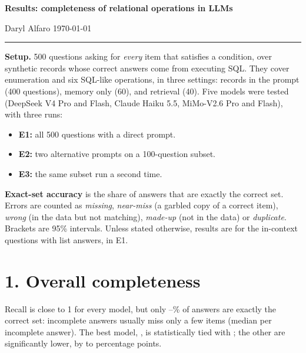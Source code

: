 \documentclass[10pt]{article}
\begin{document}
{\Large\textbf{Results: completeness of relational operations in LLMs}}\par
\vspace{2pt}
Daryl Alfaro \quad\textbullet\quad \today\par
\vspace{-2pt}\rule{\linewidth}{0.4pt}

\textbf{Setup.} 500 questions asking for \emph{every} item that satisfies a condition, over synthetic records
whose correct answers come from executing SQL. They cover enumeration and six SQL-like operations, in three
settings: records in the prompt (400 questions), memory only (60), and retrieval (40). Five models were tested
(DeepSeek V4 Pro and Flash, Claude Haiku 5.5, MiMo-V2.6 Pro and Flash), with three runs:
\begin{itemize}
\item \textbf{E1:} all 500 questions with a direct prompt.
\item \textbf{E2:} two alternative prompts on a 100-question subset.
\item \textbf{E3:} the same subset run a second time.
\end{itemize}
\textbf{Exact-set accuracy} is the share of answers that are exactly the correct set. Errors are counted as
\emph{missing}, \emph{near-miss} (a garbled copy of a correct item), \emph{wrong} (in the data but not matching),
\emph{made-up} (not in the data) or \emph{duplicate}. Brackets are 95\% intervals. Unless stated otherwise,
results are for the \nctx{} in-context questions with list answers, in E1.

\section*{1. Overall completeness}
Recall is close to 1 for every model, but only \exactmin--\exactmax\% of answers are exactly the correct set:
incomplete answers usually miss only a few items (median \medianmissed{} per incomplete answer). The best model, \bestmodel, is
statistically tied with \tiedwithbest; the other \nsigbelow{} are significantly lower, by \deltamin{} to
\deltamax{} percentage points.

\begin{table}[!htbp]
\centering\small
\resizebox{\linewidth}{!}{}
\caption{$\Delta$: paired difference in exact-set accuracy from the best model. Mean recall counts invalid
answers as 0; precision is over valid answers. \emph{Omit.}/\emph{Comm.}: share of answers that leave out a
correct item / add an incorrect or duplicate one. \emph{Invalid}: truncated, unparseable or refused.}
\label{tab:main}
\end{table}
\end{document}
